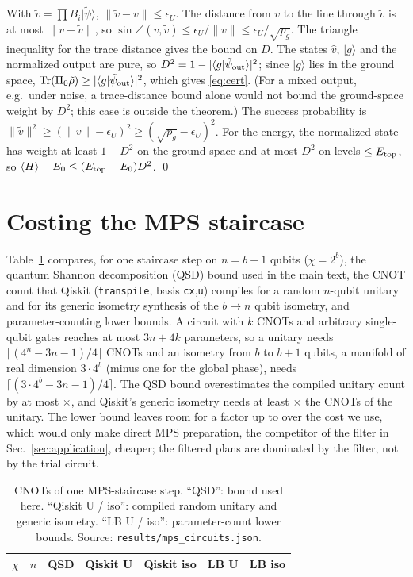 \documentclass[aps,pra,twocolumn,superscriptaddress,nofootinbib]{revtex4-2}
\newcommand{\ket}[1]{|#1\rangle}
\newcommand{\norm}[1]{\lVert#1\rVert}
\begin{document}
With $\tilde v=\prod B_i\ket{\tilde\psi}$, $\norm{\tilde v-v}\le\epsilon_U$. The distance from $v$ to the line
through $\tilde v$ is at most $\norm{v-\tilde v}$, so $\sin\angle(v,\tilde v)\le\epsilon_U/\norm v\le
\epsilon_U/\sqrt{p_g}$. The triangle inequality for the trace distance gives the bound on $D$. The
states $\hat v$, $\ket g$ and the normalized output are pure, so $D^2=1-|\langle g|\tilde\psi_{\rm out}\rangle|^2$;
since $\ket g$ lies in the ground space, $\operatorname{Tr}(\Pi_0\tilde\rho)\ge|\langle g|\tilde\psi_{\rm out}\rangle|^2$,
which gives \eqref{eq:cert}. (For a mixed output, e.g.\ under noise, a trace-distance bound alone would
not bound the ground-space weight by $D^2$; this case is outside the theorem.) The
success probability is $\norm{\tilde v}^2\ge(\norm v-\epsilon_U)^2\ge(\sqrt{p_g}-\epsilon_U)^2$. For
the energy, the normalized state has weight at least $1-D^2$ on the ground space and at most $D^2$ on
levels $\le E_{\rm top}$, so $\langle H\rangle-E_0\le(E_{\rm top}-E_0)D^2$. \qed

\section{Costing the MPS staircase}
\label{app:mps}

Table~\ref{tab:mps} compares, for one staircase step on $n=b+1$ qubits ($\chi=2^b$), the quantum Shannon decomposition (QSD) bound used in
the main text, the CNOT count that Qiskit (\texttt{transpile}, basis \texttt{cx},\texttt{u}) compiles for a random $n$-qubit unitary and for its
generic isometry synthesis of the $b\to n$ qubit isometry, and parameter-counting lower bounds. A circuit with $k$ CNOTs and arbitrary
single-qubit gates reaches at most $3n+4k$ parameters, so a unitary needs $\lceil(4^n-3n-1)/4\rceil$ CNOTs and an isometry from $b$ to $b+1$ qubits,
a manifold of real dimension $3\cdot4^b$ (minus one for the global phase), needs $\lceil(3\cdot4^b-3n-1)/4\rceil$. The QSD bound
overestimates the compiled unitary count by at most \mpsQsdOverQiskit$\times$, and Qiskit's generic isometry needs at least \mpsIsoOverUni$\times$ the CNOTs of the unitary.
The lower bound leaves room for a factor up to \mpsMaxSaving{} over the cost we use, which would only make direct MPS preparation, the competitor of the filter
in Sec.~\ref{sec:application}, cheaper; the filtered plans are dominated by the filter, not by the trial circuit.

\begin{table}[t]
\caption{CNOTs of one MPS-staircase step. ``QSD'': bound used here. ``Qiskit U / iso'': compiled random unitary and generic isometry.
``LB U / iso'': parameter-count lower bounds. Source: \texttt{results/mps\_circuits.json}.}
\label{tab:mps}
\begin{ruledtabular}
\begin{tabular}{rrrrrrr}
$\chi$ & $n$ & QSD & Qiskit U & Qiskit iso & LB U & LB iso\\
\midrule

\end{tabular}
\end{ruledtabular}
\end{table}
\end{document}
